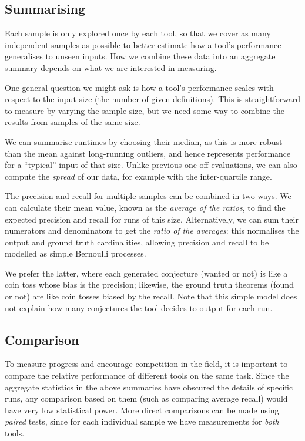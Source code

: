 \subsection{Summarising}

Each sample is only explored once by each tool, so that we cover as many
independent samples as possible to better estimate how a tool's performance
generalises to unseen inputs. How we combine these data into an aggregate
summary depends on what we are interested in measuring.

One general question we might ask is how a tool's performance scales with
respect to the input size (the number of given definitions). This is
straightforward to measure by varying the sample size, but we need some way to
combine the results from samples of the same size.

We can summarise runtimes by choosing their median, as this is more robust than
the mean against long-running outliers, and hence represents performance for a
``typical'' input of that size. Unlike previous one-off evaluations, we can also
compute the \emph{spread} of our data, for example with the inter-quartile
range.

The precision and recall for multiple samples can be combined in two ways. We
can calculate their mean value, known as the \emph{average of the ratios}, to
find the expected precision and recall for runs of this size. Alternatively, we
can sum their numerators and denominators to get the \emph{ratio of the
  averages}: this normalises the output and ground truth cardinalities, allowing
precision and recall to be modelled as simple Bernoulli processes.

We prefer the latter, where each generated conjecture (wanted or not) is like a
coin toss whose bias is the precision; likewise, the ground truth theorems
(found or not) are like coin tosses biased by the recall. Note that this simple
model does not explain how many conjectures the tool decides to output for each
run.

\subsection{Comparison}

To measure progress and encourage competition in the field, it is important to
compare the relative performance of different tools on the same task. Since the
aggregate statistics in the above summaries have obscured the details of
specific runs, any comparison based on them (such as comparing average recall)
would have very low statistical power. More direct comparisons can be made using
\emph{paired} tests, since for each individual sample we have measurements for
\emph{both} tools.

